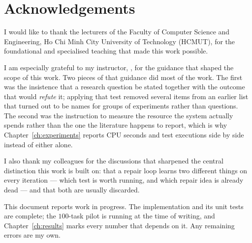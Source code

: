 \chapter*{Acknowledgements}

I would like to thank the lecturers of the Faculty of Computer Science and
Engineering, Ho Chi Minh City University of Technology (HCMUT), for the
foundational and specialised teaching that made this work possible.

I am especially grateful to my instructor, \InstructorName, for the guidance
that shaped the scope of this work. Two pieces of that guidance did most of the
work. The first was the insistence that a research question be stated together
with the outcome that would \emph{refute} it; applying that test removed several
items from an earlier list that turned out to be names for groups of experiments
rather than questions. The second was the instruction to measure the resource
the system actually spends rather than the one the literature happens to report,
which is why Chapter~\ref{ch:experiments} reports CPU seconds and test
executions side by side instead of either alone.

I also thank my colleagues for the discussions that sharpened the central
distinction this work is built on: that a repair loop learns two different
things on every iteration --- which test is worth running, and which repair idea
is already dead --- and that both are usually discarded.

This document reports work in progress. The implementation and its unit tests
are complete; the $100$-task pilot is running at the time of writing, and
Chapter~\ref{ch:results} marks every number that depends on it. Any remaining
errors are my own.
